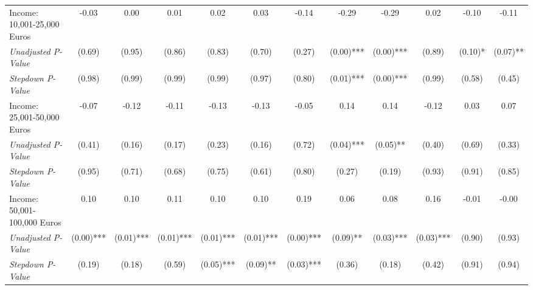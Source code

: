 \begin{tabular}{l c c c c c c c c c c c}
Income: 10,001-25,000 Euros & -0.03 & 0.00 & 0.01 & 0.02 & 0.03 & -0.14 & -0.29 & -0.29 & 0.02 & -0.10 & -0.11 \\
\quad \textit{Unadjusted P-Value} & (0.69) & (0.95) & (0.86) & (0.83) & (0.70) & (0.27) & (0.00)*** & (0.00)*** & (0.89) & (0.10)* & (0.07)** \\
\quad \textit{Stepdown P-Value} & (0.98) & (0.99) & (0.99) & (0.99) & (0.97) & (0.80) & (0.01)*** & (0.00)*** & (0.99) & (0.58) & (0.45) \\
Income: 25,001-50,000 Euros & -0.07 & -0.12 & -0.11 & -0.13 & -0.13 & -0.05 & 0.14 & 0.14 & -0.12 & 0.03 & 0.07 \\
\quad \textit{Unadjusted P-Value} & (0.41) & (0.16) & (0.17) & (0.23) & (0.16) & (0.72) & (0.04)*** & (0.05)** & (0.40) & (0.69) & (0.33) \\
\quad \textit{Stepdown P-Value} & (0.95) & (0.71) & (0.68) & (0.75) & (0.61) & (0.80) & (0.27) & (0.19) & (0.93) & (0.91) & (0.85) \\
Income: 50,001-100,000 Euros & 0.10 & 0.10 & 0.11 & 0.10 & 0.10 & 0.19 & 0.06 & 0.08 & 0.16 & -0.01 & -0.00 \\
\quad \textit{Unadjusted P-Value} & (0.00)*** & (0.01)*** & (0.01)*** & (0.01)*** & (0.01)*** & (0.00)*** & (0.09)** & (0.03)*** & (0.03)*** & (0.90) & (0.93) \\
\quad \textit{Stepdown P-Value} & (0.19) & (0.18) & (0.59) & (0.05)*** & (0.09)** & (0.03)*** & (0.36) & (0.18) & (0.42) & (0.91) & (0.94) \\
\bottomrule
\end{tabular}
